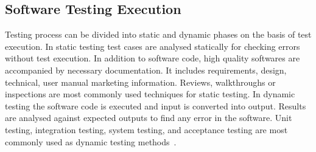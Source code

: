 





\subsection{Software Testing Execution}
Testing process can be divided into static and dynamic phases on the basis of test execution. In static testing test cases are analysed statically for checking errors without test execution. In addition to software code, high quality softwares are accompanied by necessary documentation. It includes requirements, design, technical, user manual marketing information. Reviews, walkthroughs or inspections are most commonly used techniques for static testing. In dynamic testing the software code is executed and input is converted into output. Results are analysed against expected outputs to find any error in the software. Unit testing, integration testing, system testing, and acceptance testing are most commonly used as dynamic testing methods~\cite{fairley1978tutorial}.




